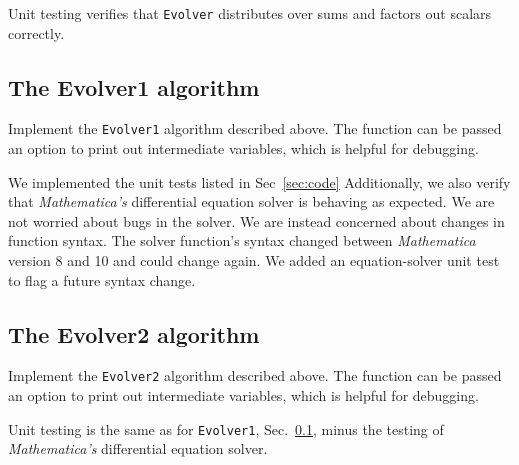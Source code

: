 

Unit testing verifies that \verb+Evolver+ distributes over sums and factors out scalars correctly.




\subsection{The Evolver1 algorithm}
\label{sec:Evolver1}

Implement the \verb+Evolver1+ algorithm described above.
The function can be passed an option to print out intermediate variables, which is helpful for debugging.



We implemented the unit tests listed in Sec~\ref{sec:code}
Additionally, we also verify that \emph{Mathematica's} differential equation solver is behaving as expected.
We are not worried about bugs in the solver. 
We are instead concerned about changes in function syntax.
The solver function's syntax changed between \emph{Mathematica} version 8 and 10 and could change again. 
We added an equation-solver unit test to flag a future syntax change.



\subsection{The Evolver2 algorithm}

Implement the \verb+Evolver2+ algorithm described above.
The function can be passed an option to print out intermediate variables, which is helpful for debugging.



Unit testing is the same as for \verb+Evolver1+, Sec.~\ref{sec:Evolver1}, minus the testing of \emph{Mathematica's} differential equation solver.



